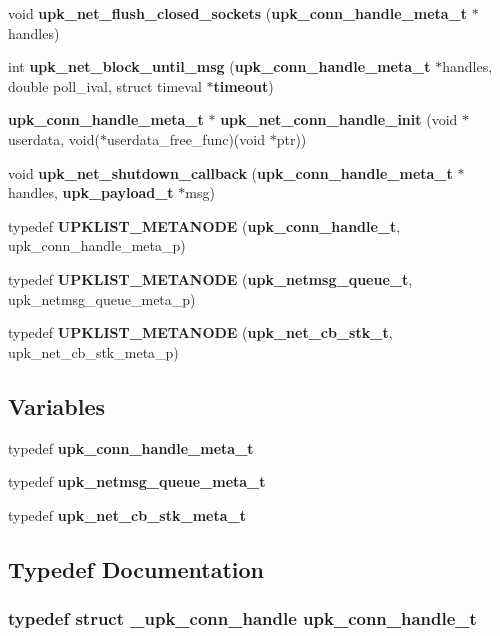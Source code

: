 \begin{DoxyCompactItemize}
\item 
void {\bf upk\_\-net\_\-flush\_\-closed\_\-sockets} ({\bf upk\_\-conn\_\-handle\_\-meta\_\-t} $\ast$handles)
\item 
int {\bf upk\_\-net\_\-block\_\-until\_\-msg} ({\bf upk\_\-conn\_\-handle\_\-meta\_\-t} $\ast$handles, double poll\_\-ival, struct timeval $\ast${\bf timeout})
\item 
{\bf upk\_\-conn\_\-handle\_\-meta\_\-t} $\ast$ {\bf upk\_\-net\_\-conn\_\-handle\_\-init} (void $\ast$userdata, void($\ast$userdata\_\-free\_\-func)(void $\ast$ptr))
\item 
void {\bf upk\_\-net\_\-shutdown\_\-callback} ({\bf upk\_\-conn\_\-handle\_\-meta\_\-t} $\ast$handles, {\bf upk\_\-payload\_\-t} $\ast$msg)
\item 
typedef {\bf UPKLIST\_\-METANODE} ({\bf upk\_\-conn\_\-handle\_\-t}, upk\_\-conn\_\-handle\_\-meta\_\-p)
\item 
typedef {\bf UPKLIST\_\-METANODE} ({\bf upk\_\-netmsg\_\-queue\_\-t}, upk\_\-netmsg\_\-queue\_\-meta\_\-p)
\item 
typedef {\bf UPKLIST\_\-METANODE} ({\bf upk\_\-net\_\-cb\_\-stk\_\-t}, upk\_\-net\_\-cb\_\-stk\_\-meta\_\-p)
\end{DoxyCompactItemize}
\subsection*{Variables}
\begin{DoxyCompactItemize}
\item 
typedef {\bf upk\_\-conn\_\-handle\_\-meta\_\-t}
\item 
typedef {\bf upk\_\-netmsg\_\-queue\_\-meta\_\-t}
\item 
typedef {\bf upk\_\-net\_\-cb\_\-stk\_\-meta\_\-t}
\end{DoxyCompactItemize}


\subsection{Typedef Documentation}
\subsubsection[{upk\_\-conn\_\-handle\_\-t}]{\setlength{\rightskip}{0pt plus 5cm}typedef struct {\bf \_\-upk\_\-conn\_\-handle} {\bf upk\_\-conn\_\-handle\_\-t}}\label{group__upk__network_ga1c7ed3b2a76c1b7ca4f48178d9147173}
